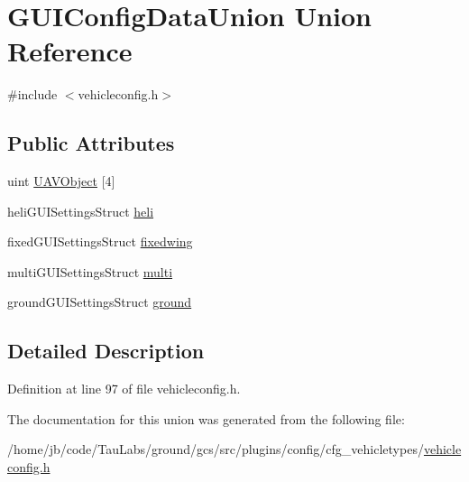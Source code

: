 \hypertarget{union_g_u_i_config_data_union}{\section{\-G\-U\-I\-Config\-Data\-Union \-Union \-Reference}
\label{union_g_u_i_config_data_union}
}


{\ttfamily \#include $<$vehicleconfig.\-h$>$}

\subsection*{\-Public \-Attributes}
\begin{DoxyCompactItemize}
\item 
uint \hyperlink{group___config_plugin_ga1a1fbf9187086cc92fac84f33f19402f}{\-U\-A\-V\-Object} \mbox{[}4\mbox{]}
\item 
heli\-G\-U\-I\-Settings\-Struct \hyperlink{group___config_plugin_gae9da8787d8f36ea6650045cf28c3b40d}{heli}
\item 
fixed\-G\-U\-I\-Settings\-Struct \hyperlink{group___config_plugin_ga10cc00a6af97a84e5f17358ed3c5eb34}{fixedwing}
\item 
multi\-G\-U\-I\-Settings\-Struct \hyperlink{group___config_plugin_ga2bab1814b15f618e30827215faea4f5e}{multi}
\item 
ground\-G\-U\-I\-Settings\-Struct \hyperlink{group___config_plugin_ga27dfb53cf12c8f8bb3a869bdfa8c11cf}{ground}
\end{DoxyCompactItemize}


\subsection{\-Detailed \-Description}


\-Definition at line 97 of file vehicleconfig.\-h.



\-The documentation for this union was generated from the following file\-:\begin{DoxyCompactItemize}
\item 
/home/jb/code/\-Tau\-Labs/ground/gcs/src/plugins/config/cfg\-\_\-vehicletypes/\hyperlink{vehicleconfig_8h}{vehicleconfig.\-h}\end{DoxyCompactItemize}
